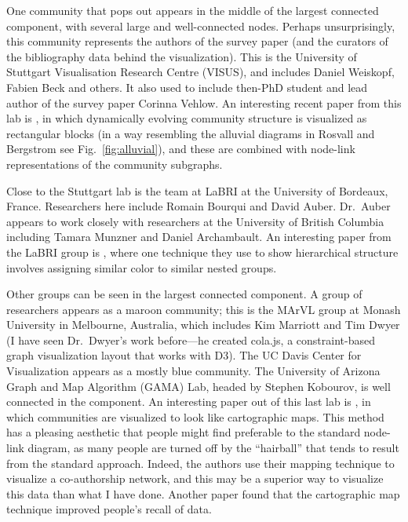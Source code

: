 One community that pops out appears in the middle of the largest
connected component, with several large and well-connected nodes.
Perhaps unsurprisingly, this community represents the authors of the
survey paper (and the curators of the bibliography data behind the
visualization). This is the University of Stuttgart Visualisation
Research Centre (VISUS), and includes Daniel Weiskopf, Fabien Beck and
others. It also used to include then-PhD student and lead author of the
survey paper Corinna Vehlow. An interesting recent paper from this lab
is \autocite{vehlow_visualizing_2015}, in which dynamically evolving
community structure is visualized as rectangular blocks (in a way
resembling the alluvial diagrams in Rosvall and Bergstrom
\autocite{rosvall_mapping_2010} see Fig.~\ref{fig:alluvial}), and these
are combined with node-link representations of the community subgraphs.

Close to the Stuttgart lab is the team at LaBRI at the University of
Bordeaux, France. Researchers here include Romain Bourqui and David
Auber. Dr.~Auber appears to work closely with researchers at the
University of British Columbia including Tamara Munzner and Daniel
Archambault. An interesting paper from the LaBRI group is
\autocite{sansen_adjasankey:_2015}, where one technique they use to show
hierarchical structure involves assigning similar color to similar
nested groups.

Other groups can be seen in the largest connected component. A group of
researchers appears as a maroon community; this is the MArVL group at
Monash University in Melbourne, Australia, which includes Kim Marriott
and Tim Dwyer (I have seen Dr.~Dwyer's work before---he created cola.js,
a constraint-based graph visualization layout that works with D3). The
UC Davis Center for Visualization appears as a mostly blue community.
The University of Arizona Graph and Map Algorithm (GAMA) Lab, headed by
Stephen Kobourov, is well connected in the component. An interesting
paper out of this last lab is \autocite{gansner_gmap:_2010}, in which
communities are visualized to look like cartographic maps. This method
has a pleasing aesthetic that people might find preferable to the
standard node-link diagram, as many people are turned off by the
``hairball'' that tends to result from the standard approach. Indeed,
the authors use their mapping technique to visualize a co-authorship
network, and this may be a superior way to visualize this data than what
I have done. Another paper \autocite{saket_map-based_2015} found that
the cartographic map technique improved people's recall of data.

